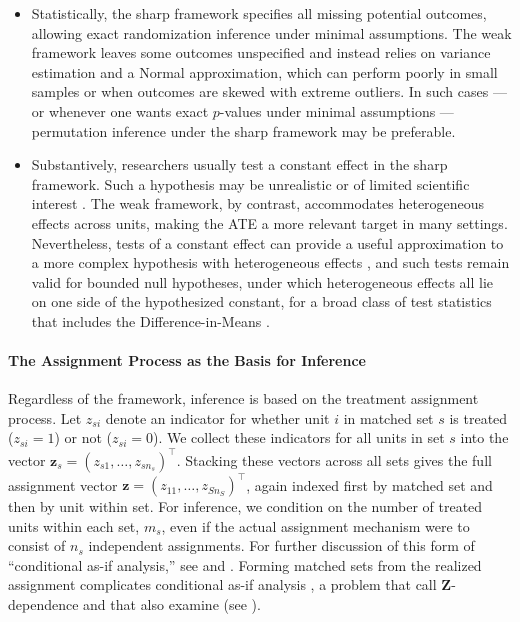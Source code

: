 \documentclass[
  12pt,
  leqno]{article}
\begin{document}
\begin{itemize}
\item
  Statistically, the sharp framework specifies all missing potential
  outcomes, allowing exact randomization inference under minimal
  assumptions. The weak framework leaves some outcomes unspecified and
  instead relies on variance estimation and a Normal approximation,
  which can perform poorly in small samples or when outcomes are skewed
  with extreme outliers. In such cases --- or whenever one wants exact
  \(p\)-values under minimal assumptions --- permutation inference under
  the sharp framework may be preferable.
\item
  Substantively, researchers usually test a constant effect in the sharp
  framework. Such a hypothesis may be unrealistic or of limited
  scientific interest
  \citetext{\citealp[see][p.~961]{gelman2011}; \citealp{caugheyetal2023}}.
  The weak framework, by contrast, accommodates heterogeneous effects
  across units, making the ATE a more relevant target in many settings.
  Nevertheless, tests of a constant effect can provide a useful
  approximation to a more complex hypothesis with heterogeneous effects
  \citep[pp.~44--46]{rosenbaum2010}, and such tests remain valid for
  bounded null hypotheses, under which heterogeneous effects all lie on
  one side of the hypothesized constant, for a broad class of test
  statistics that includes the Difference-in-Means \citep[Theorems
  1--2]{caugheyetal2023}.
\end{itemize}

\paragraph{The Assignment Process as the Basis for
Inference}\label{the-assignment-process-as-the-basis-for-inference}

Regardless of the framework, inference is based on the treatment
assignment process. Let \(z_{si}\) denote an indicator for whether unit
\(i\) in matched set \(s\) is treated (\(z_{si} = 1\)) or not
(\(z_{si} = 0\)). We collect these indicators for all units in set \(s\)
into the vector \(\bm{z}_s = (z_{s1}, \ldots, z_{sn_s})^{\top}\).
Stacking these vectors across all sets gives the full assignment vector
\(\bm{z} = (z_{11}, \ldots, z_{Sn_S})^{\top}\), again indexed first by
matched set and then by unit within set. For inference, we condition on
the number of treated units within each set, \(m_s\), even if the actual
assignment mechanism were to consist of \(n_s\) independent assignments.
For further discussion of this form of ``conditional as-if analysis,''
see \citet{pashleyetal2021} and \citet[pp.~289--290, fn.
15]{rosenbaum2017}. Forming matched sets from the realized assignment
complicates conditional as-if analysis \citep[Section
5]{pashleyetal2021}, a problem that \citet{pimentelhuang2024} call
\(\bm{Z}\)-dependence and that \citet{pimentelyu2024} also examine (see
).
\end{document}
